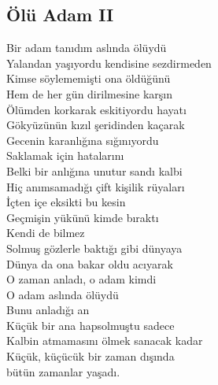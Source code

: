 \subsection{Ölü Adam II}

Bir adam tanıdım aslında ölüydü \\
Yalandan yaşıyordu kendisine sezdirmeden \\
Kimse söylememişti ona öldüğünü \\

\noindent\newline
Hem de her gün dirilmesine karşın \\
Ölümden korkarak eskitiyordu hayatı \\
Gökyüzünün kızıl şeridinden kaçarak \\
Gecenin karanlığına sığınıyordu \\
Saklamak için hatalarını \\

\noindent\newline
Belki bir anlığına unutur sandı kalbi \\
Hiç anımsamadığı çift kişilik rüyaları \\
İçten içe eksikti bu kesin \\
Geçmişin yükünü kimde bıraktı \\
Kendi de bilmez \\

\noindent\newline
Solmuş gözlerle baktığı gibi dünyaya \\
Dünya da ona bakar oldu acıyarak \\
O zaman anladı, o adam kimdi \\
O adam aslında ölüydü \\
Bunu anladığı an \\
Küçük bir ana hapsolmuştu sadece \\
Kalbin atmamasını ölmek sanacak kadar \\
Küçük, küçücük bir zaman dışında \\
bütün zamanlar yaşadı. \\